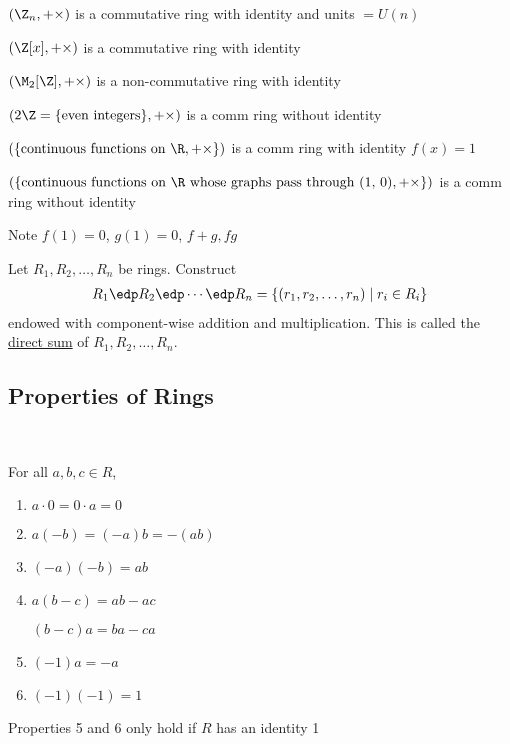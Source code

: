 \begin{example}
  \((\Z_n, +\times)\) is a commutative ring with identity and units \(=U(n)\)
\end{example}

\begin{example}
  \((\Z[x], +\times)\) is a commutative ring with identity
\end{example}

\begin{example}
  \((\M_2[\Z], +\times)\) is a non-commutative ring with identity
\end{example}

\begin{example}
  \((2\Z = \{\text{even integers}\}, +\times)\) is a comm ring without identity
\end{example}

\begin{example}
  \((\{\text{continuous functions on \R}, +\times\})\) is a comm ring with identity \(f(x) = 1\)
\end{example}

\begin{example}
  \((\{\text{continuous functions on \R\ whose graphs pass through (1, 0)}, +\times\})\) is a comm ring without identity

  Note \(f(1) = 0\), \(g(1) = 0\), \(f+g, fg\)
\end{example}

\begin{definition}
  Let \(R_1, R_2, \ldots, R_n\) be rings. Construct
  \begin{align*}
    R_1\edp R_2\edp \cdots \edp R_n = \{(r_1, r_2, \ldots, r_n) \mid r_i\in R_i\}
  \end{align*}
  endowed with component-wise addition and multiplication. This is called the \ul{direct sum} of \(R_1, R_2, \ldots, R_n\).
\end{definition}

\subsection{Properties of Rings}\

\begin{theorem}
  For all \(a,b,c\in R\),
\begin{enumerate}
  \item \(a\cdot 0 = 0\cdot a = 0\)
  \item \(a(-b) = (-a)b = -(ab)\)
  \item \((-a)(-b)=ab\)
  \item \(a(b-c) = ab-ac\)

  \((b-c)a = ba-ca\)
  \item \((-1)a = -a\)
  \item \((-1)(-1) = 1\)
\end{enumerate}
\begin{note}
Properties 5 and 6 only hold if \(R\) has an identity 1
\end{note}
\end{theorem}


